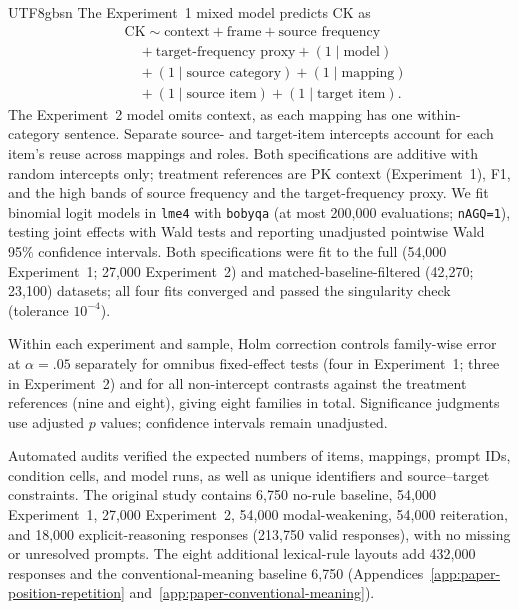 \documentclass[11pt]{article}
\begin{document}
\begin{CJK*}{UTF8}{gbsn}
The Experiment~1 mixed model predicts \textsc{CK} as
\begin{equation}
\label{eq:exp1-glmm}
\begin{aligned}
&\text{CK} \sim \text{context} + \text{frame} + \text{source frequency} \\
&\quad{}+ \text{target-frequency proxy} + (1 \mid \text{model}) \\
&\quad{}+ (1 \mid \text{source category}) + (1 \mid \text{mapping}) \\
&\quad{}+ (1 \mid \text{source item}) + (1 \mid \text{target item}) .
\end{aligned}
\end{equation}
The Experiment~2 model omits context, as each mapping has one within-category sentence. Separate source- and target-item intercepts account for each item's reuse across mappings and roles. Both specifications are additive with random intercepts only; treatment references are PK context (Experiment~1), F1, and the high bands of source frequency and the target-frequency proxy. We fit binomial logit models in \texttt{lme4} \citep{bates2015lme4} with \texttt{bobyqa} (at most 200,000 evaluations; \texttt{nAGQ=1}), testing joint effects with Wald tests and reporting unadjusted pointwise Wald 95\% confidence intervals. Both specifications were fit to the full (54,000 Experiment~1; 27,000 Experiment~2) and matched-baseline-filtered (42,270; 23,100) datasets; all four fits converged and passed the singularity check (tolerance $10^{-4}$).

Within each experiment and sample, Holm correction controls family-wise error at $\alpha=.05$ separately for omnibus fixed-effect tests (four in Experiment~1; three in Experiment~2) and for all non-intercept contrasts against the treatment references (nine and eight), giving eight families in total. Significance judgments use adjusted $p$ values; confidence intervals remain unadjusted.

Automated audits verified the expected numbers of items, mappings, prompt IDs, condition cells, and model runs, as well as unique identifiers and source--target constraints. The original study contains 6,750 no-rule baseline, 54,000 Experiment~1, 27,000 Experiment~2, 54,000 modal-weakening, 54,000 reiteration, and 18,000 explicit-reasoning responses (213,750 valid responses), with no missing or unresolved prompts. The eight additional lexical-rule layouts add 432,000 responses and the conventional-meaning baseline 6,750 (Appendices~\ref{app:paper-position-repetition} and~\ref{app:paper-conventional-meaning}).


\end{CJK*}
\end{document}
